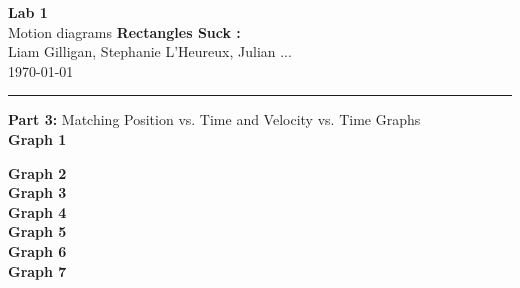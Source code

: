 \documentclass[12pt, letterpaper]{article}
\begin{document}
  \begin{titlepage} 
    \begin{center}
      \Huge{\textbf{Lab 1}}\\
      \Huge{Motion diagrams}
      \vfill
      \large{\textbf{Rectangles Suck :}}\\
      \large{Liam Gilligan, Stephanie L'Heureux, Julian ...}\\
      \vspace*{0.5cm}
      \normalsize
      \today
    \end{center}
  \end{titlepage}


  \begin{center}
    \rule{\textwidth}{0.5pt}
    \normalsize{\textbf{Part 3:} Matching Position vs. Time and Velocity vs. Time Graphs}\\
    \vspace{0.5cm}
    \textbf{Graph 1}\\
    \begin{figure}
    \end{figure}
    \textbf{Graph 2}\\
    \textbf{Graph 3}\\
    \textbf{Graph 4}\\
    \textbf{Graph 5}\\
    \textbf{Graph 6}\\
    \textbf{Graph 7}\\
  \end{center}
\end{document}
